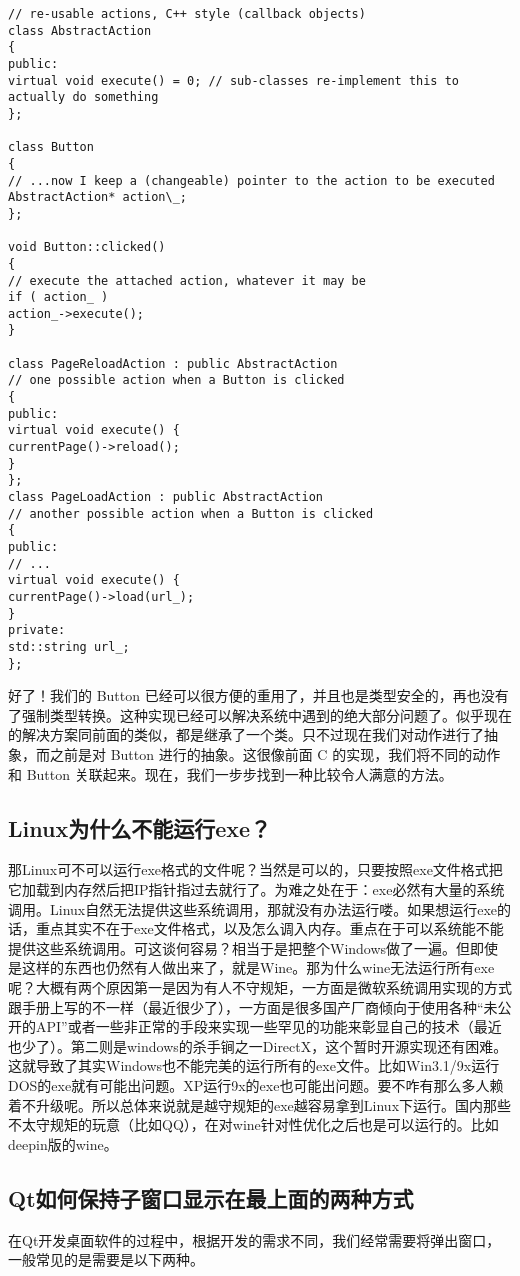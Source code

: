 \begin{lstlisting}
// re-usable actions, C++ style (callback objects)
class AbstractAction
{
public:
virtual void execute() = 0; // sub-classes re-implement this to actually do something
};

class Button
{
// ...now I keep a (changeable) pointer to the action to be executed
AbstractAction* action\_;
};

void Button::clicked()
{
// execute the attached action, whatever it may be
if ( action_ )
action_->execute();
}

class PageReloadAction : public AbstractAction
// one possible action when a Button is clicked
{
public:
virtual void execute() {
currentPage()->reload();
}
};
class PageLoadAction : public AbstractAction
// another possible action when a Button is clicked
{
public:
// ...
virtual void execute() {
currentPage()->load(url_);
}
private:
std::string url_;
};
\end{lstlisting}
好了！我们的 Button 已经可以很方便的重用了，并且也是类型安全的，再也没有了强制类型转换。这种实现已经可以解决系统中遇到的绝大部分问题了。似乎现在的解决方案同前面的类似，都是继承了一个类。只不过现在我们对动作进行了抽象，而之前是对 Button 进行的抽象。这很像前面 C 的实现，我们将不同的动作和 Button 关联起来。现在，我们一步步找到一种比较令人满意的方法。
\subsection{Linux为什么不能运行exe？}
那Linux可不可以运行exe格式的文件呢？当然是可以的，只要按照exe文件格式把它加载到内存然后把IP指针指过去就行了。为难之处在于：exe必然有大量的系统调用。Linux自然无法提供这些系统调用，那就没有办法运行喽。如果想运行exe的话，重点其实不在于exe文件格式，以及怎么调入内存。重点在于可以系统能不能提供这些系统调用。可这谈何容易？相当于是把整个Windows做了一遍。但即使是这样的东西也仍然有人做出来了，就是Wine。那为什么wine无法运行所有exe呢？大概有两个原因第一是因为有人不守规矩，一方面是微软系统调用实现的方式跟手册上写的不一样（最近很少了），一方面是很多国产厂商倾向于使用各种“未公开的API”或者一些非正常的手段来实现一些罕见的功能来彰显自己的技术（最近也少了）。第二则是windows的杀手锏之一DirectX，这个暂时开源实现还有困难。这就导致了其实Windows也不能完美的运行所有的exe文件。比如Win3.1/9x运行DOS的exe就有可能出问题。XP运行9x的exe也可能出问题。要不咋有那么多人赖着不升级呢。所以总体来说就是越守规矩的exe越容易拿到Linux下运行。国内那些不太守规矩的玩意（比如QQ），在对wine针对性优化之后也是可以运行的。比如deepin版的wine。
\subsection{Qt如何保持子窗口显示在最上面的两种方式}
在Qt开发桌面软件的过程中，根据开发的需求不同，我们经常需要将弹出窗口，一般常见的是需要是以下两种。

